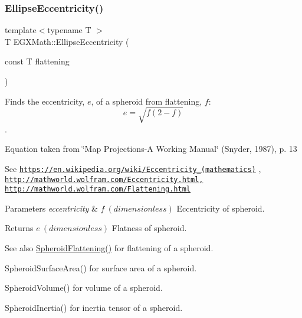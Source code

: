 \subsubsection{\texorpdfstring{Ellipse\+Eccentricity()}{EllipseEccentricity()}\hspace{0.1cm}{\footnotesize\ttfamily [1/2]}}
{\footnotesize\ttfamily template$<$typename T $>$ \\
T E\+G\+X\+Math\+::\+Ellipse\+Eccentricity (\begin{DoxyParamCaption}\item[{const T}]{flattening }\end{DoxyParamCaption})}



Finds the eccentricity, $e$, of a spheroid from flattening, $f$\+: \[ e = \sqrt{f (2 - f)} \]. 

Equation taken from \char`\"{}\+Map Projections-\/\+A Working Manual\char`\"{} (Snyder, 1987), p. 13

See \href{https://en.wikipedia.org/wiki/Eccentricity_(mathematics)}{\tt https\+://en.\+wikipedia.\+org/wiki/\+Eccentricity\+\_\+(mathematics)} , \href{http://mathworld.wolfram.com/Eccentricity.html,}{\tt http\+://mathworld.\+wolfram.\+com/\+Eccentricity.\+html,} \href{http://mathworld.wolfram.com/Flattening.html}{\tt http\+://mathworld.\+wolfram.\+com/\+Flattening.\+html} 
\begin{DoxyParams}{Parameters}
{\em eccentricity} & $ f\ (dimensionless)$ Eccentricity of spheroid. \\
\hline
\end{DoxyParams}
\begin{DoxyReturn}{Returns}
$ e\ (dimensionless)$ Flatness of spheroid. 
\end{DoxyReturn}
\begin{DoxySeeAlso}{See also}
\mbox{\hyperlink{group___e_g_x_math-_geometry-3_d-_spheroid-_flattening_ga640f4bcd86aa4c378819bffda31c0852}{Spheroid\+Flattening()}} for flattening of a spheroid. 

Spheroid\+Surface\+Area() for surface area of a spheroid. 

Spheroid\+Volume() for volume of a spheroid. 

Spheroid\+Inertia() for inertia tensor of a spheroid. 
\end{DoxySeeAlso}
\mbox{\label{group___e_g_x_math-_geometry-2_d-_ellipse-_eccentricity_gaa80b9037b15dd74c138e1a24e10111b4}} 
